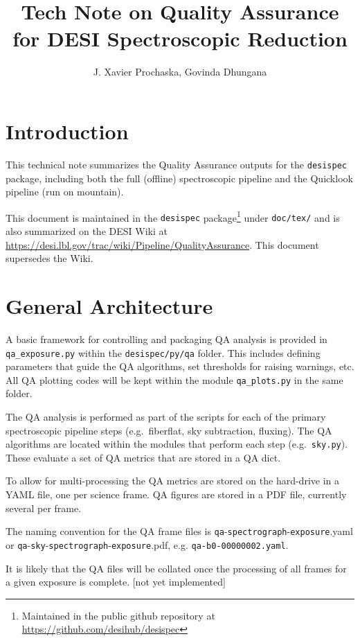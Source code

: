 \documentclass[12pt]{article}
\title{Tech Note on Quality Assurance for DESI Spectroscopic Reduction \\
\vspace{5mm}{\large\bf DESI-doc-XXX-v1}}
\author{J. Xavier Prochaska, Govinda Dhungana}
\begin{document}
\maketitle

\section{Introduction}

This technical note summarizes the Quality Assurance outputs for the
{\tt desispec} package, including both the full (offline)
spectroscopic pipeline and the Quicklook pipeline 
(run on mountain).

This document is maintained in the {\tt desispec} package\footnote{Maintained in the public github repository at \url{https://github.com/desihub/desispec}} under {\tt doc/tex/}
and is also summarized on the DESI Wiki at 
\url{https://desi.lbl.gov/trac/wiki/Pipeline/QualityAssurance}. 
This document supersedes the Wiki.

\section{General Architecture}

A basic framework for controlling and packaging
QA analysis is provided in {\tt qa\_exposure.py}
within the {\tt desispec/py/qa} folder.
This includes defining parameters that guide the QA
algorithms, set thresholds for raising warnings, etc.
All QA plotting codes will be kept within the module
{\tt qa\_plots.py} in the same folder.

The QA analysis is performed as part of the scripts for each
of the primary spectroscopic pipeline steps (e.g.\ fiberflat,
sky subtraction, fluxing).   The QA algorithms are located 
within the modules that perform each step (e.g.\ {\tt sky.py}).
These evaluate a set of QA metrics that are stored
in a QA dict.

To allow for multi-processing the QA metrics are stored
on the hard-drive in a YAML file, one per science frame.
QA figures are stored in a PDF file, 
currently several per frame.

The naming convention for the QA frame files is 
{\tt qa}-{\tt spectrograph}-{\tt exposure}.yaml or
{\tt qa}-{\tt sky}-{\tt spectrograph}-{\tt exposure}.pdf, 
e.g. {\tt qa-b0-00000002.yaml}.

It is likely that the QA files will be collated
once the processing of all frames for 
a given exposure is complete.
[not yet implemented]
\end{document}
